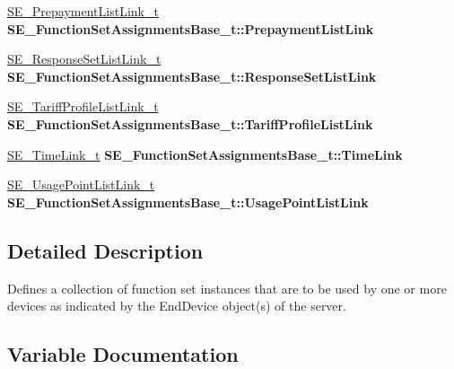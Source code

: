 \begin{DoxyCompactItemize}
\item 
\mbox{\label{group__FunctionSetAssignmentsBase_gacda97f1a3afd36b916ced5d64a72c836}} 
\hyperlink{structSE__PrepaymentListLink__t}{S\+E\+\_\+\+Prepayment\+List\+Link\+\_\+t} {\bfseries S\+E\+\_\+\+Function\+Set\+Assignments\+Base\+\_\+t\+::\+Prepayment\+List\+Link}
\item 
\mbox{\label{group__FunctionSetAssignmentsBase_ga1a09d24165e0b95b52495314f6a2419b}} 
\hyperlink{structSE__ResponseSetListLink__t}{S\+E\+\_\+\+Response\+Set\+List\+Link\+\_\+t} {\bfseries S\+E\+\_\+\+Function\+Set\+Assignments\+Base\+\_\+t\+::\+Response\+Set\+List\+Link}
\item 
\mbox{\label{group__FunctionSetAssignmentsBase_ga1031494356cfada21f342bd2697b3e1c}} 
\hyperlink{structSE__TariffProfileListLink__t}{S\+E\+\_\+\+Tariff\+Profile\+List\+Link\+\_\+t} {\bfseries S\+E\+\_\+\+Function\+Set\+Assignments\+Base\+\_\+t\+::\+Tariff\+Profile\+List\+Link}
\item 
\mbox{\label{group__FunctionSetAssignmentsBase_gad26e0e6baf60315adf6a70ed1718e7d6}} 
\hyperlink{structSE__TimeLink__t}{S\+E\+\_\+\+Time\+Link\+\_\+t} {\bfseries S\+E\+\_\+\+Function\+Set\+Assignments\+Base\+\_\+t\+::\+Time\+Link}
\item 
\mbox{\label{group__FunctionSetAssignmentsBase_ga3dc3bfcbd13799472d82872ab5089cb2}} 
\hyperlink{structSE__UsagePointListLink__t}{S\+E\+\_\+\+Usage\+Point\+List\+Link\+\_\+t} {\bfseries S\+E\+\_\+\+Function\+Set\+Assignments\+Base\+\_\+t\+::\+Usage\+Point\+List\+Link}
\end{DoxyCompactItemize}


\subsection{Detailed Description}
Defines a collection of function set instances that are to be used by one or more devices as indicated by the End\+Device object(s) of the server. 

\subsection{Variable Documentation}
\mbox{\label{group__FunctionSetAssignmentsBase_ga5d0d51e00ef4d0d4b10f4bdf5b342ef5}} 
